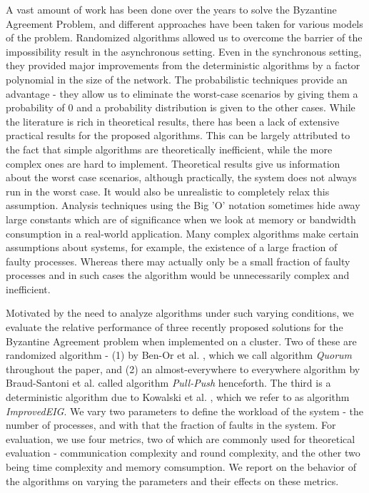 A vast amount of work has been done over the years to solve the Byzantine Agreement Problem, and different approaches have been taken for various models of the problem. Randomized algorithms allowed us to overcome the barrier of the impossibility result in the asynchronous setting. Even in the synchronous setting, they provided major improvements from the deterministic algorithms by a factor polynomial in the size of the network. The probabilistic techniques provide an advantage - they allow us to eliminate the worst-case scenarios by giving them a probability of $0$ and a probability distribution is given to the other cases. While the literature is rich in theoretical results, there has been a lack of extensive practical results for the proposed algorithms. This can be largely attributed to the fact that simple algorithms are theoretically inefficient, while the more complex ones are hard to implement. Theoretical results give us information about the worst case scenarios, although practically, the system does not always run in the worst case. It would also be unrealistic to completely relax this assumption. Analysis techniques using the Big 'O' notation sometimes hide away large constants which are of significance when we look at memory or bandwidth consumption in a real-world application. Many complex algorithms make certain assumptions about systems, for example, the existence of a large fraction of faulty processes. Whereas there may actually only be a small fraction of faulty processes and in such cases the algorithm would be unnecessarily complex and inefficient.

Motivated by the need to analyze algorithms under such varying conditions, we evaluate the relative performance of three recently proposed solutions for the Byzantine Agreement problem when implemented on a cluster. Two of these are randomized algorithm - (1) by Ben-Or et al. \cite{BPV06}, which we call algorithm \textit{Quorum} throughout the paper, and (2) an almost-everywhere to everywhere algorithm by Braud-Santoni et al. \cite{BGH13} called algorithm \textit{Pull-Push} henceforth. The third is a deterministic algorithm due to Kowalski et al. \cite{KM13}, which we refer to as algorithm \textit{ImprovedEIG}. We vary two parameters to define the workload of the system - the number of processes, and with that the fraction of faults in the system. For evaluation, we use four metrics, two of which are commonly used for theoretical evaluation - communication complexity and round complexity, and the other two being time complexity and memory comsumption. We report on the behavior of the algorithms on varying the parameters and their effects on these metrics. 

